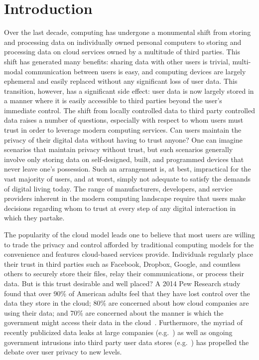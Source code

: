 \section{Introduction}
\label{sec:intro}

Over the last decade, computing has undergone a monumental shift from
storing and processing data on individually owned personal computers
to storing and processing data on cloud services owned by a multitude
of third parties. This shift has generated many benefits: sharing data
with other users is trivial, multi-modal communication between users
is easy, and computing devices are largely ephemeral and easily
replaced without any significant loss of user data. This transition,
however, has a significant side effect: user data is now largely
stored in a manner where it is easily accessible to third parties
beyond the user's immediate control. The shift from locally controlled
data to third party controlled data raises a number of questions,
especially with respect to whom users must trust in order to leverage
modern computing services. Can users maintain the privacy of their
digital data without having to trust anyone?  One can imagine
scenarios that maintain privacy without trust, but such scenarios
generally involve only storing data on self-designed, built, and
programmed devices that never leave one's possession. Such an
arrangement is, at best, impractical for the vast majority of users,
and at worst, simply not adequate to satisfy the demands of digital
living today. The range of manufacturers, developers, and service
providers inherent in the modern computing landscape require that
users make decisions regarding whom to trust at every step of any
digital interaction in which they partake.

The popularity of the cloud model leads one to believe that most users
are willing to trade the privacy and control afforded by traditional
computing models for the convenience and features cloud-based services
provide. Individuals regularly place their trust in third parties such
as Facebook, Dropbox, Google, and countless others to securely store
their files, relay their communications, or process their data. But is
this trust desirable and well placed? A 2014 Pew Research study found
that over 90\% of American adults feel that they have lost control
over the data they store in the cloud; 80\% are concerned about how
cloud companies are using their data; and 70\% are concerned about the
manner is which the government might access their data in the
cloud~\cite{pew-privsec14}. Furthermore, the myriad of recently
publicized data leaks at large companies
(e.g.~\cite{apple-icloudleak}) as well as ongoing government
intrusions into third party user data stores
(e.g.~\cite{greenwald-prism}) has propelled the debate over user
privacy to new levels.

